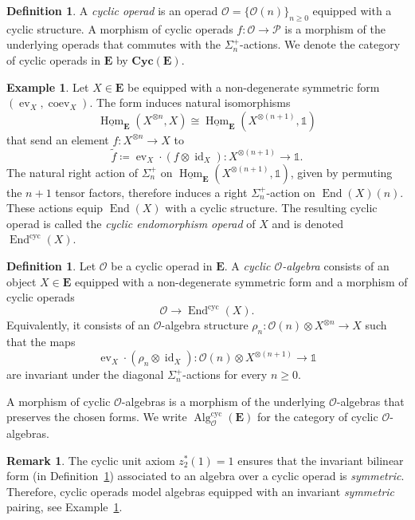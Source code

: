 \documentclass{amsart}
\newcommand{\bE}{\mathbf{E}}
\newcommand{\calO}{\mathcal{O}}
\newcommand{\calP}{\mathcal{P}}
\newcommand{\Cyc}{\mathbf{Cyc}}
\newcommand{\id}{\operatorname{id}}
\newcommand{\End}{\operatorname{End}}
\newcommand{\Hom}{\operatorname{Hom}}
\newcommand{\ev}{\operatorname{ev}}
\newcommand{\coev}{\operatorname{coev}}
\newcommand{\Alg}{\operatorname{Alg}}
\theoremstyle{definition}
\newtheorem{definition}[theorem]{Definition}%
\newtheorem{example}[theorem]{Example}%
\newtheorem{remark}[theorem]{Remark}%
\numberwithin{equation}{section}
\begin{document}
\begin{definition}
\label{def: cyclic operad}
A \emph{cyclic operad} is an operad $\calO=\{\calO(n)\}_{n\geq0}$ equipped with a cyclic structure. A morphism of cyclic operads $f\colon\calO\to\calP$ is a morphism of the underlying operads that commutes with the $\Sigma_n^+$-actions. We denote the category of cyclic operads in $\bE$ by $\Cyc(\bE)$.
\end{definition}

\begin{example} \label{example: cyclic endomorphism}
Let $X\in\bE$ be equipped with a non-degenerate symmetric form $(\ev_X,\coev_X)$. The form induces natural isomorphisms
\[
\underline{\Hom}_{\bE}(X^{\otimes n},X)
\cong
\underline{\Hom}_{\bE}(X^{\otimes(n+1)},\mathbb{1})
\] that send an element $f\colon X^{\otimes n}\to X$ to
\[
\widetilde f
\coloneqq
\ev_X\cdot(f\otimes\id_X)
\colon X^{\otimes(n+1)}\longrightarrow\mathbb{1}.
\]
The natural right action of $\Sigma_n^+$ on $\underline{\Hom}_{\bE}(X^{\otimes(n+1)},\mathbb{1})$, given by permuting the $n+1$ tensor factors, therefore induces a right $\Sigma_n^+$-action on $\End(X)(n)$. These actions equip $\End(X)$ with a cyclic structure. The resulting cyclic operad is called the \emph{cyclic endomorphism operad} of $X$ and is denoted $\End^{\mathrm{cyc}}(X)$.
\end{example}

\begin{definition}
\label{def:cyclic-algebra}
Let $\calO$ be a cyclic operad in $\bE$. A \emph{cyclic
$\calO$-algebra} consists of an object $X\in\bE$ equipped with a
non-degenerate symmetric form and a morphism of cyclic operads
\[
\calO\longrightarrow\End^{\mathrm{cyc}}(X).
\]
Equivalently, it consists of an $\calO$-algebra structure
$\rho_n\colon\calO(n)\otimes X^{\otimes n}\to X$ such that the maps
\begin{equation}
\label{eq:cyclic-algebra-invariance}
\ev_X\cdot(\rho_n\otimes\id_X)
\colon
\calO(n)\otimes X^{\otimes(n+1)}
\longrightarrow
\mathbb{1}
\end{equation}
are invariant under the diagonal $\Sigma_n^+$-actions for every
$n\geq0$.

A morphism of cyclic $\calO$-algebras is a morphism of the underlying
$\calO$-algebras that preserves the chosen forms. We write
$\Alg_{\calO}^{\mathrm{cyc}}(\bE)$ for the category of cyclic
$\calO$-algebras.
\end{definition}

\begin{remark}
The cyclic unit axiom $z_{2}^*(1)=1$ ensures that the invariant bilinear form (in Definition~\ref{def:cyclic-algebra}) associated to an algebra over a cyclic operad is \emph{symmetric}. Therefore, cyclic operads model algebras equipped with an invariant \emph{symmetric} pairing, see Example~\ref{example: cyclic endomorphism}.
\end{remark}
\end{document}
